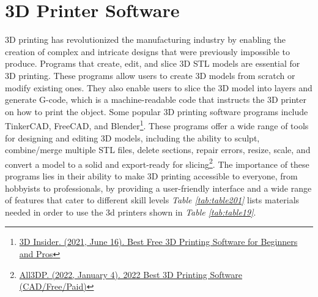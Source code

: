 \hypertarget{d-printer-materials-program}{}\section{3D Printer Software}\label{d-printer-materials-program}
3D printing has revolutionized the manufacturing industry by enabling the creation of complex and intricate designs that were previously impossible to produce. Programs that create, edit, and slice 3D STL models are essential for 3D printing. These programs allow users to create 3D models from scratch or modify existing ones. They also enable users to slice the 3D model into layers and generate G-code, which is a machine-readable code that instructs the 3D printer on how to print the object. Some popular 3D printing software programs include TinkerCAD, FreeCAD, and Blender\footnote{\raggedright \href{https://3dinsider.com/free-3d-printing-software/}{3D Insider. (2021, June 16). Best Free 3D Printing Software for Beginners and Pros}}. These programs offer a wide range of tools for designing and editing 3D models, including the ability to sculpt, combine/merge multiple STL files, delete sections, repair errors, resize, scale, and convert a model to a solid and export-ready for slicing\footnote{\raggedright \href{https://all3dp.com/1/best-3d-printing-software-tools/}{All3DP. (2022, January 4). 2022 Best 3D Printing Software (CAD/Free/Paid)}}. The importance of these programs lies in their ability to make 3D printing accessible to everyone, from hobbyists to professionals, by providing a user-friendly interface and a wide range of features that cater to different skill levels
\textit{Table \ref{tab:table201}} lists materials needed in order to use the 3d printers shown in \textit{Table \ref{tab:table19}}.
\pagebreak 
 
